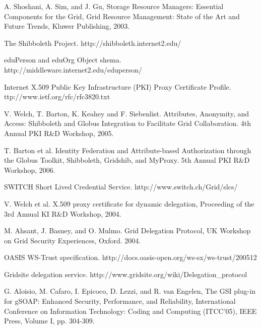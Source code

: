 \documentclass[twocolumn]{svjour3}         %
\begin{document}
\begin{thebibliography}{}
A. Shoshani, A. Sim, and J. Gu, Storage Resource Managers: Essential Components for the Grid, Grid Resource Management: State of the Art and Future Trends, Kluwer Publishing, 2003.

The Shibboleth Project. http://shibboleth.internet2.edu/

eduPerson and eduOrg Object shema. http://middleware.internet2.edu/eduperson/

Internet X.509 Public Key Infrastructure (PKI) Proxy Certificate Profile. ttp://www.ietf.org/rfc/rfc3820.txt

V. Welch, T. Barton, K. Keahey and F. Siebenlist. Attributes, Anonymity, and Access: Shibboleth and Globus Integration to Facilitate Grid Collaboration. 4th Annual PKI R\&D Workshop, 2005.

T. Barton et al. Identity Federation and Attribute-based Authorization through the Globus Toolkit, Shibboleth, Gridshib, and MyProxy. 5th Annual PKI R\&D Workshop, 2006.

SWITCH Short Lived Credential Service. http://www.switch.ch/Grid/slcs/

V. Welch et al. X.509 proxy certificate for dynamic delegation, Proceeding of the 3rd Annual KI R\&D Workshop, 2004.

M. Ahsant, J. Basney, and O. Mulmo. Grid Delegation Protocol, UK Workshop on Grid Security Experiences, Oxford. 2004.

OASIS WS-Trust specification. http://docs.oasis-open.org/ws-sx/ws-trust/200512

Gridsite delegation service. http://www.gridsite.org/wiki/Delegation\_protocol

G. Aloisio, M. Cafaro, I. Epicoco, D. Lezzi, and R. van Engelen, The GSI plug-in for gSOAP: Enhanced Security, Performance, and Reliability, International Conference on Information Technology: Coding and Computing (ITCC'05), IEEE Press, Volume I, pp. 304-309.

\end{thebibliography}
\end{document}
